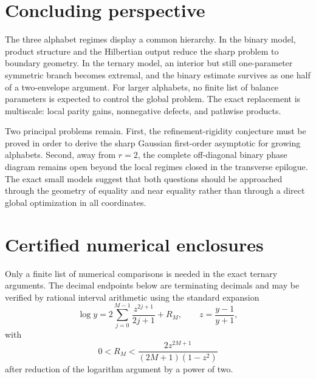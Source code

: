 \documentclass[11pt,reqno]{amsart}
\numberwithin{equation}{section}
\theoremstyle{definition}
\theoremstyle{remark}
\begin{document}
\section{Concluding perspective}
The three alphabet regimes display a common hierarchy.  In the binary model, product structure and the Hilbertian output reduce the sharp problem to boundary geometry.  In the ternary model, an interior but still one-parameter symmetric branch becomes extremal, and the binary estimate survives as one half of a two-envelope argument.  For larger alphabets, no finite list of balance parameters is expected to control the global problem.  The exact replacement is multiscale: local parity gains, nonnegative defects, and pathwise products.

Two principal problems remain.  First, the refinement-rigidity conjecture must be proved in order to derive the sharp Gaussian first-order asymptotic for growing alphabets.  Second, away from $r=2$, the complete off-diagonal binary phase diagram remains open beyond the local regimes closed in the transverse epilogue.  The exact small models suggest that both questions should be approached through the geometry of equality and near equality rather than through a direct global optimization in all coordinates.
\appendix
\section{Certified numerical enclosures}\label{app:intervals}

Only a finite list of numerical comparisons is needed in the exact ternary
arguments.  The decimal endpoints below are terminating decimals and may
be verified by rational interval arithmetic using the standard expansion
\[
  \log y
  =2\sum_{j=0}^{M-1}\frac{z^{2j+1}}{2j+1}+R_M,
  \qquad
  z=\frac{y-1}{y+1},
\]
with
\[
  0<R_M<\frac{2z^{2M+1}}{(2M+1)(1-z^2)}
\]
after reduction of the logarithm argument by a power of two.
\end{document}
